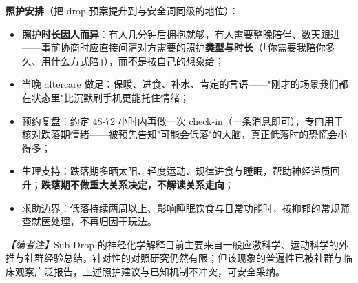 \documentclass[12pt,UTF8]{ctexbook}
\begin{document}
\textbf{照护安排}（把 drop 预案提升到与安全词同级的地位）：
\begin{itemize}
\item \textbf{照护时长因人而异}：有人几分钟后拥抱就够，有人需要整晚陪伴、数天跟进——事前协商时应直接问清对方需要的照护\textbf{类型与时长}（「你需要我陪你多久、用什么方式陪」），而不是按自己的想象给；
\item 当晚 aftercare 做足：保暖、进食、补水、肯定的言语——"刚才的场景我们都在状态里"比沉默刷手机更能托住情绪；
\item 预约复盘：约定 48-72 小时内再做一次 check-in（一条消息即可），专门用于核对跌落期情绪——被预先告知"可能会低落"的大脑，真正低落时的恐慌会小得多；
\item 生理支持：跌落期多晒太阳、轻度运动、规律进食与睡眠，帮助神经递质回升；\textbf{跌落期不做重大关系决定，不解读关系走向}；
\item 求助边界：低落持续两周以上、影响睡眠饮食与日常功能时，按抑郁的常规筛查就医处理，不再归因于玩法。
\end{itemize}

\noindent\textit{【编者注】}Sub Drop 的神经化学解释目前主要来自一般应激科学、运动科学的外推\citep{sagarin2009}与社群经验总结，针对性的对照研究仍然有限；但该现象的普遍性已被社群与临床观察广泛报告，上述照护建议与已知机制不冲突，可安全采纳。
\end{document}
